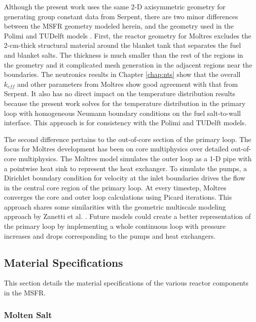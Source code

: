 Although the present work uses the same 2-D axisymmetric geometry for
generating group constant data from Serpent, there are two minor differences
between the \gls{MSFR} geometry modeled herein, and the geometry used in the
Polimi and TUDelft models \cite{fiorina_modelling_2014}. First, the reactor
geometry for
Moltres excludes the 2-cm-thick structural material around the blanket tank
that separates the fuel and blanket salts. The thickness is much smaller than
the rest of the regions in the geometry and it complicated mesh generation in
the adjacent regions near the boundaries. The
neutronics results in Chapter \ref{chap:nts} show that the overall $k_{eff}$
and other parameters from Moltres show good agreement with that from Serpent.
It also has no direct impact on the temperature distribution results because
the present work solves for the temperature distribution in the primary loop
with homogeneous Neumann boundary conditions on the fuel salt-to-wall
interface. This approach is for consistency with the Polimi and TUDelft
models.

The second difference pertains to the out-of-core section of the primary loop.
The focus for Moltres development has been on core multiphysics over detailed
out-of-core multiphysics. The Moltres model simulates the outer loop as a 1-D
pipe with a pointwise heat sink to represent the heat exchanger. To simulate
the pumps, a Dirichlet boundary condition for velocity at the inlet boundaries
drives the flow in the central core region of the primary loop. At every
timestep, Moltres converges the core and outer loop calculations using Picard
iterations. This approach shares some similarities with the
geometric multiscale modeling approach by Zanetti et al.
\cite{zanetti_geometric_2015}. Future models could create a better
representation of the primary loop by implementing a whole continuous loop
with pressure increases and drops corresponding to the pumps and heat
exchangers.

\subsection{Material Specifications}

This section details the material specifications of the various reactor
components in the \gls{MSFR}.

\subsubsection{Molten Salt}

